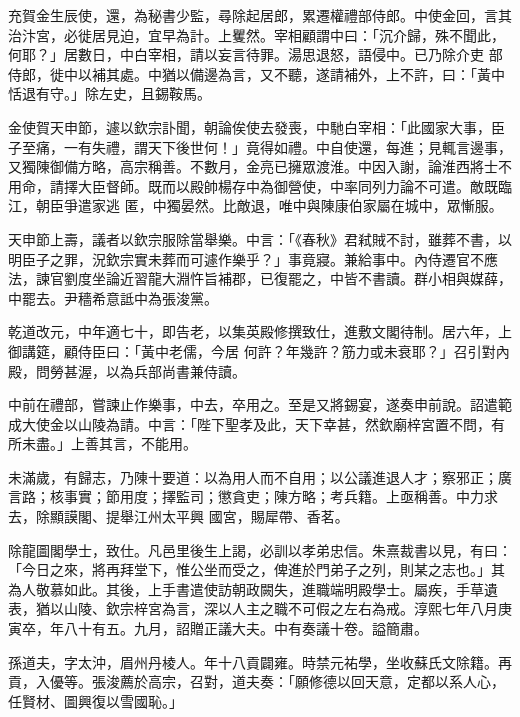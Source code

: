 \begin{pinyinscope}
 充賀金生辰使，還，為秘書少監，尋除起居郎，累遷權禮部侍郎。中使金回，言其治汴宮，必徙居見迫，宜早為計。上矍然。宰相顧謂中曰：「沉介歸，殊不聞此，何耶？」居數日，中白宰相，請以妄言待罪。湯思退怒，語侵中。已乃除介吏
 部侍郎，徙中以補其處。中猶以備邊為言，又不聽，遂請補外，上不許，曰：「黃中恬退有守。」除左史，且錫鞍馬。



 金使賀天申節，遽以欽宗訃聞，朝論俟使去發喪，中馳白宰相：「此國家大事，臣子至痛，一有失禮，謂天下後世何！」竟得如禮。中自使還，每進；見輒言邊事，又獨陳御備方略，高宗稱善。不數月，金亮已擁眾渡淮。中因入謝，論淮西將士不用命，請擇大臣督師。既而以殿帥楊存中為御營使，中率同列力論不可遣。敵既臨江，朝臣爭遣家逃
 匿，中獨晏然。比敵退，唯中與陳康伯家屬在城中，眾慚服。



 天申節上壽，議者以欽宗服除當舉樂。中言：「《春秋》君弒賊不討，雖葬不書，以明臣子之罪，況欽宗實未葬而可遽作樂乎？」事竟寢。兼給事中。內侍遷官不應法，諫官劉度坐論近習龍大淵忤旨補郡，已復罷之，中皆不書讀。群小相與媒薛，中罷去。尹穡希意詆中為張浚黨。



 乾道改元，中年適七十，即告老，以集英殿修撰致仕，進敷文閣待制。居六年，上御講筵，顧侍臣曰：「黃中老儒，今居
 何許？年幾許？筋力或未衰耶？」召引對內殿，問勞甚渥，以為兵部尚書兼侍讀。



 中前在禮部，嘗諫止作樂事，中去，卒用之。至是又將錫宴，遂奏申前說。詔遣範成大使金以山陵為請。中言：「陛下聖孝及此，天下幸甚，然欽廟梓宮置不問，有所未盡。」上善其言，不能用。



 未滿歲，有歸志，乃陳十要道：以為用人而不自用；以公議進退人才；察邪正；廣言路；核事實；節用度；擇監司；懲貪吏；陳方略；考兵籍。上亟稱善。中力求去，除顯謨閣、提舉江州太平興
 國宮，賜犀帶、香茗。



 除龍圖閣學士，致仕。凡邑里後生上謁，必訓以孝弟忠信。朱熹裁書以見，有曰：「今日之來，將再拜堂下，惟公坐而受之，俾進於門弟子之列，則某之志也。」其為人敬慕如此。其後，上手書遣使訪朝政闕失，進職端明殿學士。屬疾，手草遺表，猶以山陵、欽宗梓宮為言，深以人主之職不可假之左右為戒。淳熙七年八月庚寅卒，年八十有五。九月，詔贈正議大夫。中有奏議十卷。謚簡肅。



 孫道夫，字太沖，眉州丹棱人。年十八貢闢雍。時禁元祐學，坐收蘇氏文除籍。再貢，入優等。張浚薦於高宗，召對，道夫奏：「願修德以回天意，定都以系人心，任賢材、圖興復以雪國恥。」




\end{pinyinscope}
